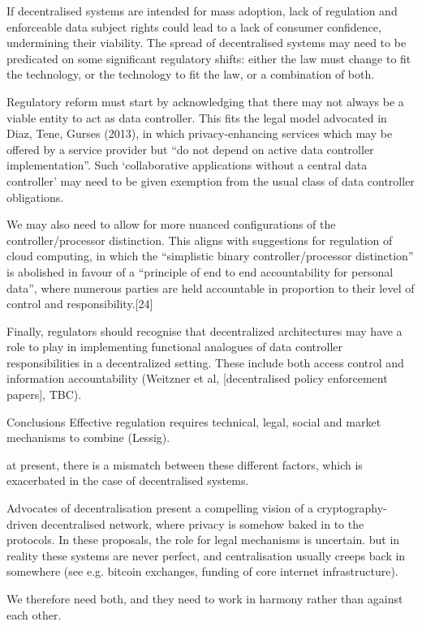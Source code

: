 \documentclass{acm_proc_article-sp}
\begin{document}
If decentralised systems are intended for mass adoption, lack of regulation and enforceable data subject rights could lead to a lack of consumer confidence, undermining their viability. The spread of decentralised systems may need to be predicated on some significant regulatory shifts: either the law must change to fit the technology, or the technology to fit the law, or a combination of both.
 
Regulatory reform must start by acknowledging that there may not always be a viable entity to act as data controller. This fits the legal model advocated in Diaz, Tene, Gurses (2013), in which privacy-enhancing services which may be offered by a service provider but “do not depend on active data controller implementation”. Such ‘collaborative applications without a central data controller’ may need to be given exemption from the usual class of data controller obligations.
 
We may also need to allow for more nuanced configurations of the controller/processor distinction. This aligns with suggestions for regulation of cloud computing, in which the “simplistic binary controller/processor distinction” is abolished in favour of a “principle of end to end accountability for personal data”, where numerous parties are held accountable in proportion to their level of control and responsibility.[24]

Finally, regulators should recognise that decentralized architectures may have a role to play in implementing functional analogues of data controller responsibilities in a decentralized setting. These include both access control and information accountability (Weitzner et al, [decentralised policy enforcement papers], TBC).

Conclusions
Effective regulation requires technical, legal, social and market mechanisms to combine (Lessig).

at present, there is a mismatch between these different factors, which is exacerbated in the case of decentralised systems.

Advocates of decentralisation present a compelling vision of a cryptography-driven decentralised network, where privacy is somehow baked in to the protocols. In these proposals, the role for legal mechanisms is uncertain. but in reality these systems are never perfect, and centralisation usually creeps back in somewhere (see e.g. bitcoin exchanges, funding of core internet infrastructure).

We therefore need both, and they need to work in harmony rather than against each other.
\end{document}
